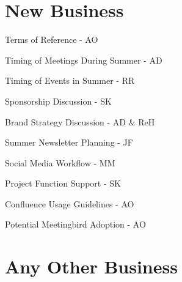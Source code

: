 \documentclass[11pt,hacksoc,agenda]{meetingmins}
\begin{document}
\section{New Business}
\begin{items}
  \item
  Terms of Reference - AO

  \item
  Timing of Meetings During Summer - AD

  \item
  Timing of Events in Summer - RR

  \item 
  Sponsorship Discussion - SK

  \item 
  Brand Strategy Discussion - AD \& ReH

  \item 
  Summer Newsletter Planning - JF

  \item 
  Social Media Workflow - MM

  \item 
  Project Function Support - SK

  \item 
  Confluence Usage Guidelines - AO

  \item 
  Potential Meetingbird Adoption - AO
\end{items}

\section{Any Other Business}

\vspace{1em}
\nextmeeting{}
\end{document}
